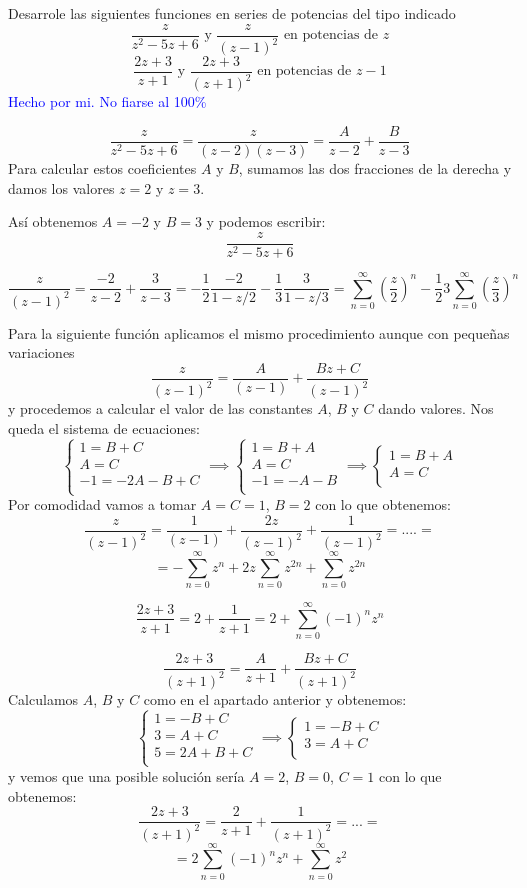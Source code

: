 \begin{problem}[15]
Desarrole las siguientes funciones en series de potencias del tipo indicado
\ppart
\[\frac{z}{z^2-5z+6} \text{ y } \frac{z}{(z-1)^2} \text{ en potencias de } z\]
\ppart
\[\frac{2z+3}{z+1} \text{ y } \frac{2z+3}{(z+1)^2} \text{ en potencias de } z-1\]
\solution
\textcolor{blue}{Hecho por mi. No fiarse al 100\%}

\spart
\[\frac{z}{z^2-5z+6} = \frac{z}{(z-2)(z-3)} = \frac{A}{z-2}+\frac{B}{z-3}\]
Para calcular estos coeficientes $A$ y $B$, sumamos las dos fracciones de la derecha y damos los valores $z=2$ y $z=3$.

Así obtenemos $A=-2$ y $B=3$ y podemos escribir:
\[\frac{z}{z^2-5z+6}\]

\[\frac{z}{(z-1)^2}= \frac{-2}{z-2}+\frac{3}{z-3} = -\frac{1}{2}\frac{-2}{1-z/2}-\frac{1}{3}\frac{3}{1-z/3} = \sum_{n=0}^{\infty} \left(\frac{z}{2}\right)^n -\frac{1}{2}3\sum_{n=0}^{\infty}\left(\frac{z}{3}\right)^n \]

Para la siguiente función aplicamos el mismo procedimiento aunque con pequeñas variaciones
\[\frac{z}{(z-1)^2}=\frac{A}{(z-1)}+\frac{Bz+C}{(z-1)^2}\]
y procedemos a calcular el valor de las constantes $A$, $B$ y $C$ dando valores. Nos queda el sistema de ecuaciones:
\[\begin{cases}
	1=B+C\\
	A=C \\
	-1=-2A-B+C \\
	\end{cases} \implies \begin{cases}
	1=B+A\\
	A=C \\
	-1=-A-B \\
	\end{cases} \implies \begin{cases}
	1=B+A\\
	A=C \\
	\end{cases}\]
Por comodidad vamos a tomar $A=C=1$, $B=2$ con lo que obtenemos:
\[\frac{z}{(z-1)^2}=\frac{1}{(z-1)}+\frac{2z}{(z-1)^2}+\frac{1}{(z-1)^2} = .... =\]
\[= -\sum_{n=0}^{\infty} z^n+2z\sum_{n=0}^{\infty}z^{2n}+\sum_{n=0}^{\infty}z^{2n}\]

\spart
\[\frac{2z+3}{z+1} = 2 + \frac{1}{z+1}= 2 +\sum_{n=0}^{\infty}(-1)^nz^n\]

\[\frac{2z+3}{(z+1)^2} = \frac{A}{z+1}+\frac{Bz+C}{(z+1)^2}\]
Calculamos $A$, $B$ y $C$ como en el apartado anterior y obtenemos:
\[\begin{cases}
	1=-B+C\\
	3=A+C \\
	5=2A+B+C \\
	\end{cases} \implies \begin{cases}
	1=-B+C\\
	3=A+C \\
	\end{cases} \]
	y vemos que una posible solución sería $A=2$, $B=0$, $C=1$
con lo que obtenemos:
\[\frac{2z+3}{(z+1)^2} = \frac{2}{z+1}+\frac{1}{(z+1)^2} = ... =\]
\[=2\sum_{n=0}^{\infty}(-1)^nz^n+\sum_{n=0}^{\infty}z^2\]
\end{problem}

